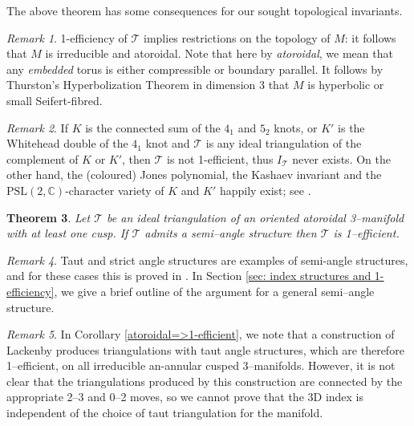 \documentclass[12pt]{amsart}
\newtheorem{thm}{Theorem}[section]
\theoremstyle{definition}
\theoremstyle{remark}
\newtheorem{rmk}[thm]{Remark}
\def\BC{\mathbb C}
\def\lbl{\label}
\newcommand{\CT}{\mathcal{T}}
\begin{document}
The above theorem has some consequences for our sought topological invariants.

\begin{rmk}
\lbl{rem.1}
1-efficiency of $\CT$ implies restrictions on the topology of $M$: it follows
that $M$ is irreducible and atoroidal. 
Note that here by \emph{atoroidal}, we mean that any \emph{embedded} torus 
is either compressible or boundary parallel. It follows by 
Thurston's Hyperbolization Theorem 
in dimension $3$ that $M$ is hyperbolic or 
small Seifert-fibred.
\end{rmk}

\begin{rmk}
\lbl{rem.2}
If $K$ is the connected sum of the $4_1$ and $5_2$ knots, or $K'$ is the
Whitehead double of the $4_1$ knot and $\CT$ is any ideal triangulation of
the complement of $K$ or $K'$, then $\CT$ is not 1-efficient, thus
$I_{\CT}$ never exists. On the other hand, the (coloured) Jones polynomial, 
the Kashaev invariant and the $\mathrm{PSL}(2,\BC)$-character variety of 
$K$ and $K'$ happily exist; see \cite{Jo,Ka,CCGLS}.
\end{rmk}


\begin{thm}
\lbl{semi-angle => 1-efficient}
Let $\CT$ be an ideal triangulation of an oriented atoroidal 3--manifold with 
at least one cusp. If $\CT$ admits a semi--angle structure then $\CT$ is 1--efficient.
\end{thm}

\begin{rmk}
\lbl{rem.3}
Taut and strict
angle structures are examples of semi-angle structures, and for these cases this is proved in \cite[Thm.2.6]{KR2}. In Section \ref{sec: index structures and 1-efficiency}, we give a brief outline of the argument for a general semi--angle structure.
\end{rmk}

\begin{rmk}
In Corollary \ref{atoroidal=>1-efficient}, we note that a construction of Lackenby produces triangulations with taut angle structures, which are therefore 1--efficient, on all irreducible an-annular cusped 3--manifolds. However, it is not clear that the triangulations produced by this construction are connected by the appropriate 2--3 and 0--2 moves, so we cannot prove that the 3D index is independent of the choice of taut triangulation for the manifold. 
\end{rmk}
\end{document}
